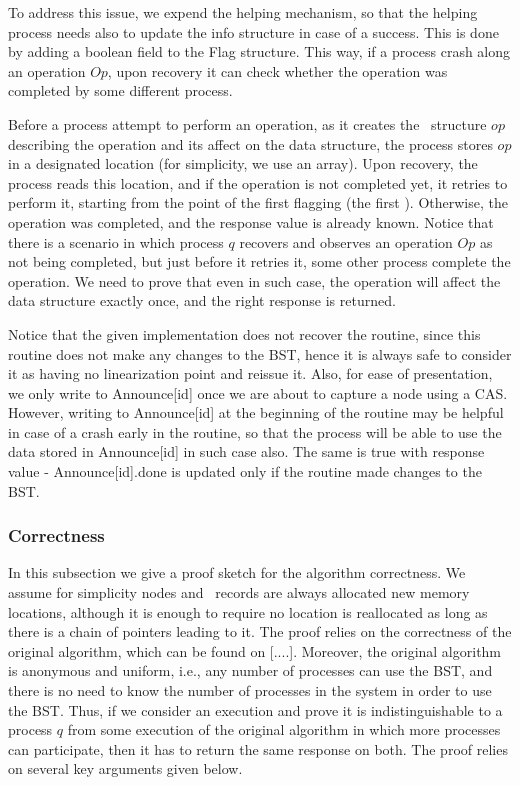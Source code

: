 To address this issue, we expend the helping mechanism, so that the helping process needs also to update the info structure in case of a success. This is done by adding a boolean field to the Flag structure. This way, if a process crash along an operation $Op$, upon recovery it can check whether the operation was completed by some different process. 

Before a process attempt to perform an operation, as it creates the \Flag\ structure $op$ describing the operation and its affect on the data structure, the process stores $op$ in a designated location (for simplicity, we use an array). Upon recovery, the process reads this location, and if the operation is not completed yet, it retries to perform it, starting from the point of the first flagging (the first \CASB). Otherwise, the operation was completed, and the response value is already known. Notice that there is a scenario in which process $q$ recovers and observes an operation $Op$ as not being completed, but just before it retries it, some other process complete the operation. We need to prove that even in such case, the operation will affect the data structure exactly once, and the right response is returned.

Notice that the given implementation does not recover the  routine, since this routine does not make any changes to the BST, hence it is always safe to consider it as having no linearization point and reissue it. Also, for ease of presentation, we only write to Announce[id] once we are about to capture a node using a CAS. However, writing to Announce[id] at the beginning of the routine may be helpful in case of a crash early in the routine, so that the process will be able to use the data stored in Announce[id] in such case also. The same is true with response value - Announce[id].done is updated only if the routine made changes to the BST.

\subsubsection{Correctness}

In this subsection we give a proof sketch for the algorithm correctness. We assume for simplicity nodes and \Flag\ records are always allocated new memory locations, although it is enough to require no location is reallocated as long as there is a chain of pointers leading to it. The proof relies on the correctness of the original algorithm, which can be found on [....]. Moreover, the original algorithm is anonymous and uniform, i.e., any number of processes can use the BST, and there is no need to know the number of processes in the system in order to use the BST. Thus, if we consider an execution and prove it is indistinguishable to a process $q$ from some execution of the original algorithm in which more processes can participate, then it has to return the same response on both.
The proof relies on several key arguments given below.

